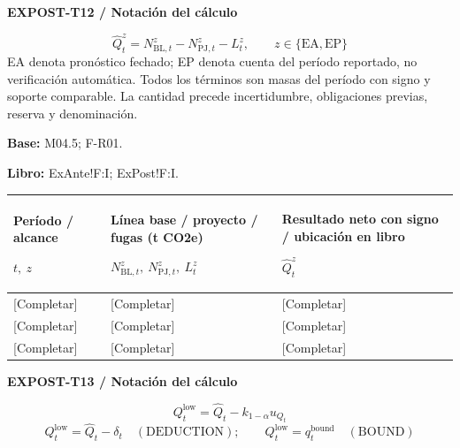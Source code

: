 \par\begingroup\sffamily\fontsize{8}{10}\selectfont\color{NEBGreen}\setlength{\parskip}{2pt}\setlength{\abovedisplayskip}{4pt}\setlength{\belowdisplayskip}{4pt}\setlength{\abovedisplayshortskip}{2pt}\setlength{\belowdisplayshortskip}{3pt}
\textbf{EXPOST-T12 / Notación del cálculo}\par
{\fontsize{9}{11}\selectfont\[ \widehat Q_t^z=N_{\mathrm{BL},t}^z-N_{\mathrm{PJ},t}^z-L_t^z,\qquad z\in\{\mathrm{EA},\mathrm{EP}\} \]}
EA denota pronóstico fechado; EP denota cuenta del período reportado, no verificación automática. Todos los términos son masas del período con signo y soporte comparable. La cantidad precede incertidumbre, obligaciones previas, reserva y denominación.\par
\textbf{Base:} M04.5; F-R01.\par
\textbf{Libro:} ExAnte!F:I; ExPost!F:I.\par\endgroup
{\sffamily\fontsize{8.3}{10.3}\selectfont\begin{longtable}{@{}P{54.83mm} P{54.83mm} P{54.83mm}@{}}
\toprule
\textbf{Período / alcance}\par {\normalfont\fontsize{8.2}{10}\selectfont $t,\ z$} & \textbf{Línea base / proyecto / fugas (t CO2e)}\par {\normalfont\fontsize{8.2}{10}\selectfont $N_{\mathrm{BL},t}^z,\ N_{\mathrm{PJ},t}^z,\ L_t^z$} & \textbf{Resultado neto con signo / ubicación en libro}\par {\normalfont\fontsize{8.2}{10}\selectfont $\widehat Q_t^z$}\\\midrule\endhead
\rule{0pt}{8mm}[Completar] & [Completar] & [Completar]\\\hline
\rule{0pt}{8mm}[Completar] & [Completar] & [Completar]\\\hline
\rule{0pt}{8mm}[Completar] & [Completar] & [Completar]\\\hline
\end{longtable}}
\par\begingroup\sffamily\fontsize{8}{10}\selectfont\color{NEBGreen}\setlength{\parskip}{2pt}\setlength{\abovedisplayskip}{4pt}\setlength{\belowdisplayskip}{4pt}\setlength{\abovedisplayshortskip}{2pt}\setlength{\belowdisplayshortskip}{3pt}
\textbf{EXPOST-T13 / Notación del cálculo}\par
{\fontsize{9}{11}\selectfont\[ Q_t^{\mathrm{low}}=\widehat Q_t-k_{1-\alpha}u_{Q_t} \]}
{\fontsize{9}{11}\selectfont\[ Q_t^{\mathrm{low}}=\widehat Q_t-\delta_t\quad(\mathrm{DEDUCTION});\qquad Q_t^{\mathrm{low}}=q_t^{\mathrm{bound}}\quad(\mathrm{BOUND}) \]}

